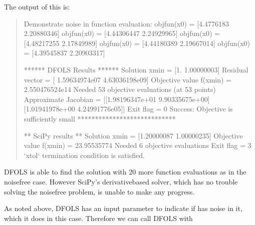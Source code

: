 \documentclass[letterpaper,10pt,english]{sphinxmanual}
\begin{document}
\sphinxAtStartPar
The output of this is:
\begin{quote}

\begin{sphinxVerbatim}[commandchars=\\\{\}]
Demonstrate noise in function evaluation:
objfun(x0) = [\PYGZhy{}4.4776183   2.20880346]
objfun(x0) = [\PYGZhy{}4.44306447  2.24929965]
objfun(x0) = [\PYGZhy{}4.48217255  2.17849989]
objfun(x0) = [\PYGZhy{}4.44180389  2.19667014]
objfun(x0) = [\PYGZhy{}4.39545837  2.20903317]

****** DFO\PYGZhy{}LS Results ******
Solution xmin = [1.         1.00000003]
Residual vector = [ 1.59634974e\PYGZhy{}07 \PYGZhy{}4.63036198e\PYGZhy{}09]
Objective value f(xmin) = 2.550476524e\PYGZhy{}14
Needed 53 objective evaluations (at 53 points)
Approximate Jacobian = [[\PYGZhy{}1.98196347e+01  9.90335675e+00]
 [\PYGZhy{}1.01941978e+00  4.24991776e\PYGZhy{}05]]
Exit flag = 0
Success: Objective is sufficiently small
****************************


** SciPy results **
Solution xmin = [\PYGZhy{}1.20000087  1.00000235]
Objective value f(xmin) = 23.95535774
Needed 6 objective evaluations
Exit flag = 3
`xtol` termination condition is satisfied.
\end{sphinxVerbatim}
\end{quote}

\sphinxAtStartPar
DFO\sphinxhyphen{}LS is able to find the solution with 20 more function evaluations as in the noise\sphinxhyphen{}free case. However SciPy’s derivative\sphinxhyphen{}based solver, which has no trouble solving the noise\sphinxhyphen{}free problem, is unable to make any progress.

\sphinxAtStartPar
As noted above, DFO\sphinxhyphen{}LS has an input parameter  to indicate if  has noise in it, which it does in this case. Therefore we can call DFO\sphinxhyphen{}LS with
\begin{quote}

\begin{sphinxVerbatim}[commandchars=\\\{\}]
    
\end{sphinxVerbatim}
\end{quote}
\end{document}
